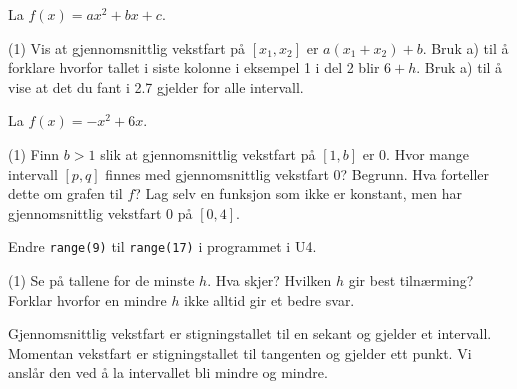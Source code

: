 La $f(x) = ax^2 + bx + c$.
\begin{tasks}(1)
  \task Vis at gjennomsnittlig vekstfart på $[x_1, x_2]$ er $a(x_1 + x_2) + b$.
  \task Bruk a) til å forklare hvorfor tallet i siste kolonne i eksempel 1 i del 2 blir $6 + h$.
  \task Bruk a) til å vise at det du fant i 2.7 gjelder for alle intervall.
\end{tasks}

La $f(x) = -x^2 + 6x$.
\begin{tasks}(1)
  \task Finn $b > 1$ slik at gjennomsnittlig vekstfart på $[1, b]$ er $0$.
  \task Hvor mange intervall $[p, q]$ finnes med gjennomsnittlig vekstfart $0$? Begrunn.
  \task Hva forteller dette om grafen til $f$?
  \task Lag selv en funksjon som ikke er konstant, men har gjennomsnittlig vekstfart $0$ på $[0, 4]$.
\end{tasks}

Endre \lstinline[style=laereverk,numbers=none,frame=none]|range(9)| til \lstinline[style=laereverk,numbers=none,frame=none]|range(17)| i programmet i U4.
\begin{tasks}(1)
  \task Se på tallene for de minste $h$. Hva skjer? Hvilken $h$ gir best tilnærming?
  \task Forklar hvorfor en mindre $h$ ikke alltid gir et bedre svar.
\end{tasks}

\begin{oppsummering}
Gjennomsnittlig vekstfart er stigningstallet til en sekant og gjelder et intervall.
Momentan vekstfart er stigningstallet til tangenten og gjelder ett punkt.
Vi anslår den ved å la intervallet bli mindre og mindre.
\end{oppsummering}
